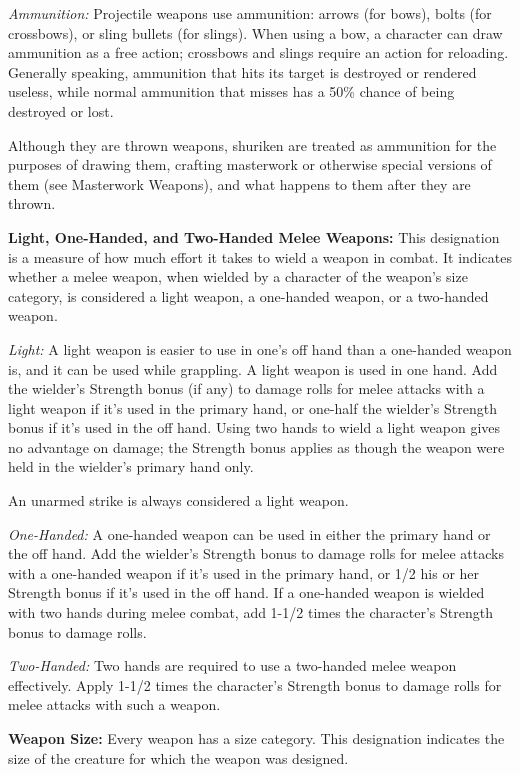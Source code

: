 \documentclass{article}
\begin{document}
\textit{Ammunition: }Projectile weapons use ammunition: arrows (for bows), bolts 
(for crossbows), or sling bullets (for slings). When using a bow, a character can 
draw ammunition as a free action; crossbows and slings require an action for reloading. 
Generally speaking, ammunition that hits its target is destroyed or rendered useless, 
while normal ammunition that misses has a 50\% chance of being destroyed or lost.

Although they are thrown weapons, shuriken are treated as ammunition for the purposes 
of drawing them, crafting masterwork or otherwise special versions of them (see 
Masterwork Weapons), and what happens to them after they are thrown.

\vspace{12pt}
\textbf{Light, One-Handed, and Two-Handed Melee Weapons:} This designation is a 
measure of how much effort it takes to wield a weapon in combat. It indicates whether 
a melee weapon, when wielded by a character of the weapon's size category, is considered 
a light weapon, a one-handed weapon, or a two-handed weapon.

\textit{Light: }A light weapon is easier to use in one's off hand than a one-handed 
weapon is, and it can be used while grappling. A light weapon is used in one hand. 
Add the wielder's Strength bonus (if any) to damage rolls for melee attacks with 
a light weapon if it's used in the primary hand, or one-half the wielder's Strength 
bonus if it's used in the off hand. Using two hands to wield a light weapon gives 
no advantage on damage; the Strength bonus applies as though the weapon were held 
in the wielder's primary hand only.

An unarmed strike is always considered a light weapon.

\textit{One-Handed: }A one-handed weapon can be used in either the primary hand 
or the off hand. Add the wielder's Strength bonus to damage rolls for melee attacks 
with a one-handed weapon if it's used in the primary hand, or 1/2 his or her Strength 
bonus if it's used in the off hand. If a one-handed weapon is wielded with two 
hands during melee combat, add 1-1/2 times the character's Strength bonus to damage 
rolls.

\textit{Two-Handed: }Two hands are required to use a two-handed melee weapon effectively. 
Apply 1-1/2 times the character's Strength bonus to damage rolls for melee attacks 
with such a weapon. 

\vspace{12pt}
\textbf{Weapon Size:} Every weapon has a size category. This designation indicates 
the size of the creature for which the weapon was designed.
\end{document}
